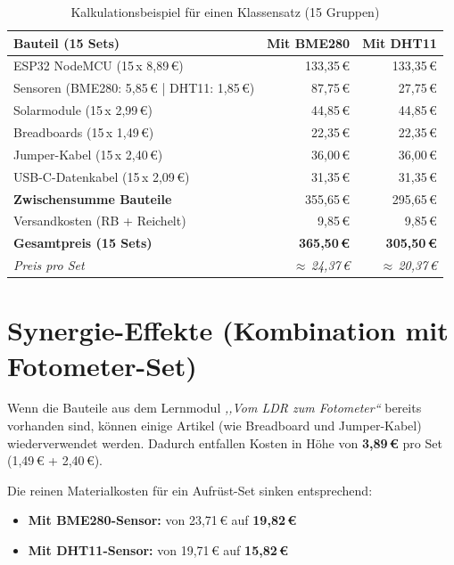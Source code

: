 \documentclass[a4paper,12pt]{article}
\begin{document}
\begin{table}[h!]
\centering
\renewcommand{\arraystretch}{1.35}
\begin{tabular}{@{} l r r @{}}
\toprule
\textbf{Bauteil (15 Sets)} & \textbf{Mit BME280} & \textbf{Mit DHT11} \\
\midrule
ESP32 NodeMCU (15\,x 8,89\,\euro{}) & 133,35\,\euro{} & 133,35\,\euro{} \\
Sensoren (BME280: 5,85\,\euro{} | DHT11: 1,85\,\euro{}) & 87,75\,\euro{} & 27,75\,\euro{} \\
Solarmodule (15\,x 2,99\,\euro{}) & 44,85\,\euro{} & 44,85\,\euro{} \\
Breadboards (15\,x 1,49\,\euro{}) & 22,35\,\euro{} & 22,35\,\euro{} \\
Jumper-Kabel (15\,x 2,40\,\euro{}) & 36,00\,\euro{} & 36,00\,\euro{} \\
USB-C-Datenkabel (15\,x 2,09\,\euro{}) & 31,35\,\euro{} & 31,35\,\euro{} \\
\midrule
\textbf{Zwischensumme Bauteile} & 355,65\,\euro{} & 295,65\,\euro{} \\
Versandkosten (RB + Reichelt) & 9,85\,\euro{} & 9,85\,\euro{} \\
\midrule
\textbf{Gesamtpreis (15 Sets)} & \textbf{365,50\,\euro{}} & \textbf{305,50\,\euro{}} \\
\textit{Preis pro Set} & \textit{$\approx$\,24,37\,\euro{}} & \textit{$\approx$\,20,37\,\euro{}} \\
\bottomrule
\end{tabular}
\caption{Kalkulationsbeispiel für einen Klassensatz (15 Gruppen)}
\label{tab:klassensatz}
\end{table}

\section{Synergie-Effekte (Kombination mit Fotometer-Set)}
Wenn die Bauteile aus dem Lernmodul \emph{,,Vom LDR zum Fotometer``} bereits vorhanden sind, können einige Artikel (wie Breadboard und Jumper-Kabel) wiederverwendet werden. Dadurch entfallen Kosten in Höhe von \textbf{3,89\,\euro{}} pro Set (1,49\,\euro{} + 2,40\,\euro{}). 

Die reinen Materialkosten für ein Aufrüst-Set sinken entsprechend:
\begin{itemize}
  \item \textbf{Mit BME280-Sensor:} von 23,71\,\euro{} auf \textbf{19,82\,\euro{}}
  \item \textbf{Mit DHT11-Sensor:} von 19,71\,\euro{} auf \textbf{15,82\,\euro{}}
\end{itemize}
\end{document}
